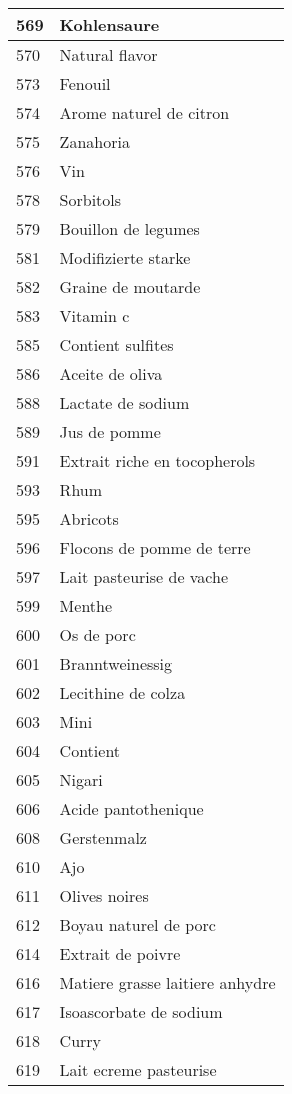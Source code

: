 \begin{longtable}{|l|l|}
569 & Kohlensaure \\ \hline 
570 & Natural flavor \\ \hline 
573 & Fenouil \\ \hline 
574 & Arome naturel de citron \\ \hline 
575 & Zanahoria \\ \hline 
576 & Vin \\ \hline 
578 & Sorbitols \\ \hline 
579 & Bouillon de legumes \\ \hline 
581 & Modifizierte starke \\ \hline 
582 & Graine de moutarde \\ \hline 
583 & Vitamin c \\ \hline 
585 & Contient sulfites \\ \hline 
586 & Aceite de oliva \\ \hline 
588 & Lactate de sodium \\ \hline 
589 & Jus de pomme \\ \hline 
591 & Extrait riche en tocopherols \\ \hline 
593 & Rhum \\ \hline 
595 & Abricots \\ \hline 
596 & Flocons de pomme de terre \\ \hline 
597 & Lait pasteurise de vache \\ \hline 
599 & Menthe \\ \hline 
600 & Os de porc \\ \hline 
601 & Branntweinessig \\ \hline 
602 & Lecithine de colza \\ \hline 
603 & Mini \\ \hline 
604 & Contient \\ \hline 
605 & Nigari \\ \hline 
606 & Acide pantothenique \\ \hline 
608 & Gerstenmalz \\ \hline 
610 & Ajo \\ \hline 
611 & Olives noires \\ \hline 
612 & Boyau naturel de porc \\ \hline 
614 & Extrait de poivre \\ \hline 
616 & Matiere grasse laitiere anhydre \\ \hline 
617 & Isoascorbate de sodium \\ \hline 
618 & Curry \\ \hline 
619 & Lait ecreme pasteurise \\ \hline 

\end{longtable}
